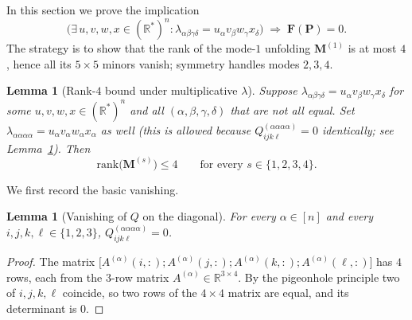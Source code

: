 \documentclass[12pt]{article}
\newtheorem{lemma}[theorem]{Lemma}
\theoremstyle{definition}
\begin{document}
In this section we prove the implication
\[
\bigl(\exists\, u,v,w,x\in(\mathbb{R}^*)^n\colon \lambda_{\alpha\beta\gamma\delta}=u_\alpha v_\beta w_\gamma x_\delta\bigr)
\;\Longrightarrow\;\mathbf{F}(\mathbf{P})=0.
\]
The strategy is to show that the rank of the mode-$1$ unfolding $\mathbf{M}^{(1)}$ is at
most $4$, hence all its $5\times 5$ minors vanish; symmetry handles modes $2,3,4$.

\begin{lemma}[Rank-$4$ bound under multiplicative $\lambda$]\label{lem:fwd-rank}
Suppose $\lambda_{\alpha\beta\gamma\delta}=u_\alpha v_\beta w_\gamma x_\delta$ for some
$u,v,w,x\in(\mathbb{R}^*)^n$ and all $(\alpha,\beta,\gamma,\delta)$ that are not all equal.
Set $\lambda_{\alpha\alpha\alpha\alpha}=u_\alpha v_\alpha w_\alpha x_\alpha$ as well (this is
allowed because $Q^{(\alpha\alpha\alpha\alpha)}_{ijk\ell}=0$ identically; see
Lemma~\ref{lem:Q-skew}). Then
\[
\mathrm{rank}\bigl(\mathbf{M}^{(s)}\bigr)\leq 4\qquad\text{for every }s\in\{1,2,3,4\}.
\]
\end{lemma}

We first record the basic vanishing.

\begin{lemma}[Vanishing of $Q$ on the diagonal]\label{lem:Q-skew}
For every $\alpha\in[n]$ and every $i,j,k,\ell\in\{1,2,3\}$,
$Q^{(\alpha\alpha\alpha\alpha)}_{ijk\ell}=0$.
\end{lemma}

\begin{proof}
The matrix $\bigl[A^{(\alpha)}(i,:);A^{(\alpha)}(j,:);A^{(\alpha)}(k,:);A^{(\alpha)}(\ell,:)\bigr]$
has $4$ rows, each from the $3$-row matrix $A^{(\alpha)}\in\mathbb{R}^{3\times 4}$. By the
pigeonhole principle two of $i,j,k,\ell$ coincide, so two rows of the $4\times 4$ matrix are
equal, and its determinant is $0$.
\end{proof}
\end{document}
